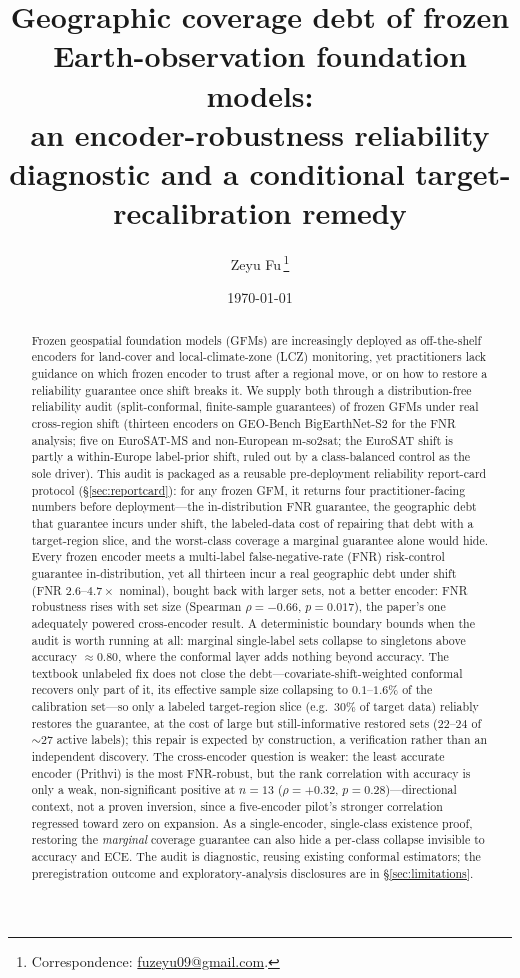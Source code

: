 \documentclass[11pt]{article}
\title{\textbf{Geographic coverage debt of frozen Earth-observation foundation models:\\
an encoder-robustness reliability diagnostic and a conditional target-recalibration remedy}}
\author{Zeyu Fu\,\orcidlink{0009-0001-8329-0108}\thanks{%
    Correspondence: \href{mailto:fuzeyu09@gmail.com}{fuzeyu09@gmail.com}.}}
\affil{State Key Laboratory of Trauma and Chemical Poisoning, Institute of Combined Injury, Army
    Medical University, Chongqing, China}
\date{\today}
\begin{document}
\maketitle

\begin{abstract}
Frozen geospatial foundation models (GFMs) are increasingly deployed as off-the-shelf encoders for
land-cover and local-climate-zone (LCZ) monitoring, yet practitioners lack guidance on which frozen
encoder to trust after a regional move, or on how to restore a reliability guarantee once shift breaks
it. We supply both through a distribution-free reliability audit (split-conformal, finite-sample
guarantees) of frozen GFMs under real cross-region shift (thirteen encoders on GEO-Bench BigEarthNet-S2
for the FNR analysis; five on EuroSAT-MS \citep{helber2019eurosat} and non-European m-so2sat; the EuroSAT
shift is partly a within-Europe label-prior shift, ruled out by a class-balanced control as the sole
driver). This audit is packaged as a reusable pre-deployment reliability report-card protocol
(\S\ref{sec:reportcard}): for any frozen GFM, it returns four practitioner-facing numbers before
deployment---the in-distribution FNR guarantee, the geographic debt that guarantee incurs under shift,
the labeled-data cost of repairing that debt with a target-region slice, and the worst-class coverage a
marginal guarantee alone would hide. Every frozen encoder meets a multi-label false-negative-rate (FNR) risk-control guarantee
in-distribution, yet all thirteen incur a real geographic debt under shift (FNR $2.6$--$4.7\times$
nominal), bought back with larger sets, not a better encoder: FNR robustness rises with set size (Spearman
$\rho=-0.66$, $p{=}0.017$), the paper's one adequately powered cross-encoder result. A deterministic
boundary bounds when the audit is worth running at all: marginal single-label sets collapse to singletons
above accuracy $\approx0.80$, where the conformal layer adds nothing beyond accuracy. The textbook
unlabeled fix does not close the debt---covariate-shift-weighted conformal recovers only part of it, its
effective sample size collapsing to $0.1$--$1.6\%$ of the calibration set---so only a labeled
target-region slice (e.g.\ $30\%$ of target data) reliably restores the guarantee, at the cost of large
but still-informative restored sets ($22$--$24$ of ${\sim}27$ active labels); this repair is expected by
construction, a verification rather than an independent discovery. The cross-encoder question is weaker:
the least accurate encoder (Prithvi) is the most FNR-robust, but the rank correlation with accuracy is
only a weak, non-significant positive at $n{=}13$ ($\rho=+0.32$, $p{=}0.28$)---directional context, not a
proven inversion, since a five-encoder pilot's stronger correlation regressed toward zero on expansion.
As a single-encoder, single-class existence proof, restoring the \emph{marginal} coverage guarantee can
also hide a per-class collapse invisible to accuracy and ECE. The audit is diagnostic, reusing existing
conformal estimators; the preregistration outcome and exploratory-analysis disclosures are in
\S\ref{sec:limitations}.
\end{abstract}
\end{document}
